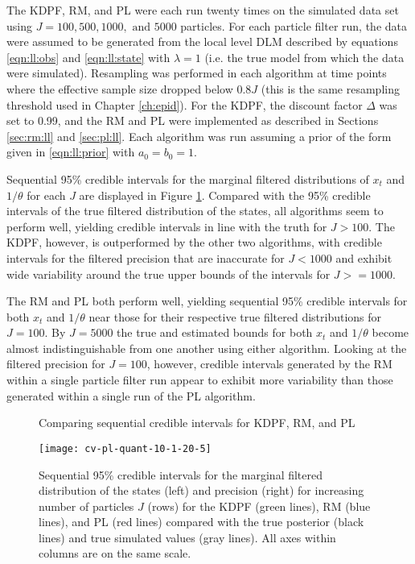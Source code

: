 The KDPF, RM, and PL were each run twenty times on the simulated data set using $J = 100, 500, 1000, \mbox{ and } 5000$ particles. For each particle filter run, the data were assumed to be generated from the local level DLM described by equations \eqref{eqn:ll:obs} and \eqref{eqn:ll:state} with $\lambda = 1$ (i.e. the true model from which the data were simulated). Resampling was performed in each algorithm at time points where the effective sample size dropped below $0.8J$ (this is the same resampling threshold used in Chapter \ref{ch:epid}). For the KDPF, the discount factor $\Delta$ was set to 0.99, and the RM and PL were implemented as described in Sections \ref{sec:rm:ll} and \ref{sec:pl:ll}. Each algorithm was run assuming a prior of the form given in \eqref{eqn:ll:prior} with $a_0 = b_0 = 1$.

Sequential 95\% credible intervals for the marginal filtered distributions of $x_t$ and $1/\theta$ for each $J$ are displayed in Figure \ref{fig:comp:quant}. Compared with the 95\% credible intervals of the true filtered distribution of the states, all algorithms seem to perform well, yielding credible intervals in line with the truth for $J > 100$. The KDPF, however, is outperformed by the other two algorithms, with credible intervals for the filtered precision that are inaccurate for $J < 1000$ and exhibit wide variability around the true upper bounds of the intervals for $J >= 1000$.

The RM and PL both perform well, yielding sequential 95\% credible intervals for both $x_t$ and $1/\theta$ near those for their respective true filtered distributions for $J = 100$. By $J = 5000$ the true and estimated bounds for both $x_t$ and $1/\theta$ become almost indistinguishable from one another using either algorithm. Looking at the filtered precision for $J = 100$, however, credible intervals generated by the RM within a single particle filter run appear to exhibit more variability than those generated within a single run of the PL algorithm.

\begin{figure}[ht]
\ssp
\centering
\caption{Comparing sequential credible intervals for KDPF, RM, and PL} \label{fig:comp:quant}
\texttt{[image: cv-pl-quant-10-1-20-5]}
\caption*{Sequential 95\% credible intervals for the marginal filtered distribution of the states (left) and precision (right) for increasing number of particles $J$ (rows) for the KDPF (green lines), RM (blue lines), and PL (red lines) compared with the true posterior (black lines) and true simulated values (gray lines). All axes within columns are on the same scale.}
\end{figure}

